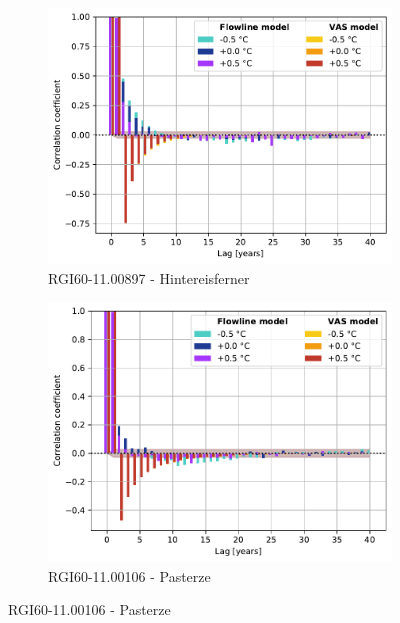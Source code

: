 \begin{figure}[htp]
        \begin{subfigure}[b]{0.48\textwidth}
          \caption{RGI60-11.00897 - Hintereisferner}
          \label{fig:acf:hintereisferner}
          \centering
          \includegraphics[width=\textwidth]{../plots/final_plots/acf/partial_Hintereisferner.pdf}
        \end{subfigure}
        \hfill
        \begin{subfigure}[b]{0.48\textwidth}
          \caption{RGI60-11.00106 - Pasterze}
          \label{fig:acf:pasterze}
          \centering
          \includegraphics[width=\textwidth]{../plots/final_plots/acf/partial_Pasterze.pdf}
        \end{subfigure}


\end{figure}
